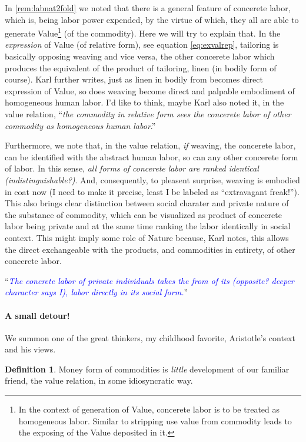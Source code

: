 \documentclass[12pt]{extarticle}
\theoremstyle{definition}
\newtheorem{definition}{Definition}[section]
\begin{document}
In \ref{rem:labnat2fold} we noted that there is a general feature of concerete labor, which is, being labor power expended, by the virtue of which, they all are able to generate Value\footnote{In the context of generation of Value, concerete labor is to be treated as homogeneous labor.  Similar to stripping use value from commodity leads to the exposing of the Value deposited in it.} (of the commodity). Here we will try to explain that. In the \emph{expression} of Value (of relative form), see equation \ref{eq:exvalrep}, tailoring is basically opposing weaving and vice versa, the other concerete labor which produces the equivalent of the product of tailoring, linen (in bodily form of course).  Karl further writes, just as linen in bodily from becomes direct expression of Value, so does weaving become direct and palpable embodiment of homogeneous human labor.  I'd like to think, maybe Karl also noted it, in the value relation, ``\emph{the commodity in relative form sees the concerete labor of other commodity as homogeneous human labor}.''

Furthermore, we note that, in the value relation, \emph{if} weaving, the concerete labor, can be identified with the abstract human labor, so can any other concerete form of labor.  In this sense, \emph{all forms of concerete labor are ranked identical (indistinguishable?)}.  And, consequently, to pleasent surprise, weaving is embodied in coat now (I need to make it precise, least I be labeled as ``extravagant freak!'').  This also brings clear distinction between social charater and private nature of the substance of commodity, which can be visualized as product of concerete labor being private and at the same time ranking the labor identically in social context.  This might imply some role of Nature because, Karl notes, this allows the direct exchangeable with the products, and commodities in entirety, of other concerete labor.

``\emph{\textcolor{blue}{The concrete labor of private individuals takes the from of its (opposite? deeper character says I), labor directly in its social form.}}''

\paragraph{A small detour!}
We summon one of the great thinkers, my childhood favorite, Aristotle's context and his views.
\begin{definition}
  \label{def:moneyAris}
  Money form of commodities is \emph{little} development of our familiar friend, the value relation, in some idiosyncratic way.
\end{definition}
\end{document}
